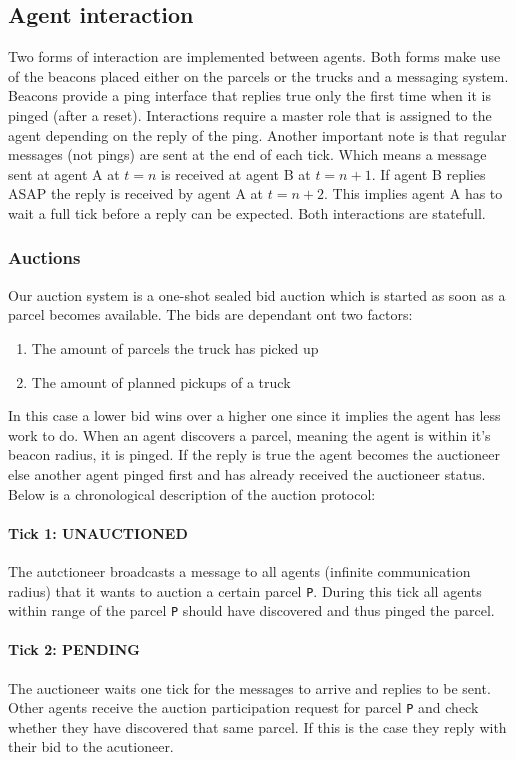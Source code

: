 \documentclass[../main.tex]{subfiles}
\begin{document}
\subsection{Agent interaction}
Two forms of interaction are implemented between agents.
Both forms make use of the beacons placed either on the parcels or the trucks and a messaging system.
Beacons provide a ping interface that replies true only the first time when it is pinged (after a reset).
Interactions require a master role that is assigned to the agent depending on the reply of the ping.
Another important note is that regular messages (not pings) are sent at the end of each tick.
Which means a message sent at agent A at $t=n$ is received at agent B at $t=n+1$.
If agent B replies ASAP the reply is received by agent A at $t=n+2$.
This implies agent A has to wait a full tick before a reply can be expected.
Both interactions are statefull.

\subsubsection{Auctions}
Our auction system is a one-shot sealed bid auction which is started as soon as a parcel becomes available.
The bids are dependant ont two factors:
\begin{enumerate}
	\item The amount of parcels the truck has picked up
	\item The amount of planned pickups of a truck
\end{enumerate}
In this case a lower bid wins over a higher one since it implies the agent has less work to do.
When an agent discovers a parcel, meaning the agent is within it's beacon radius, it is pinged.
If the reply is true the agent becomes the auctioneer else another agent pinged first and has already received the auctioneer status. 
Below is a chronological description of the auction protocol:

\paragraph{Tick 1: UNAUCTIONED}
The autctioneer broadcasts a message to all agents (infinite communication radius) that it wants to auction a certain parcel \texttt{P}.
During this tick all agents within range of the parcel \texttt{P} should have discovered and thus pinged the parcel.
\paragraph{Tick 2: PENDING}
The auctioneer waits one tick for the messages to arrive and replies to be sent.
Other agents receive the auction participation request for parcel \texttt{P} and check whether they have discovered that same parcel. 
If this is the case they reply with their bid to the acutioneer.
\end{document}
